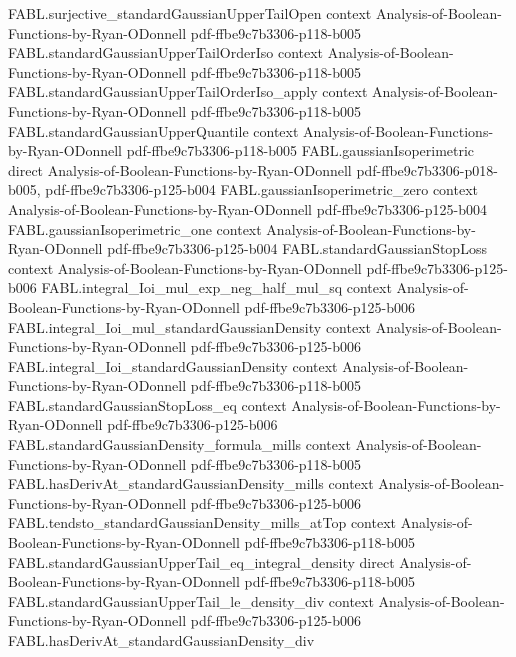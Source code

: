 \begin{theorem}
\proofstep
  {FABL.surjective_standardGaussianUpperTailOpen}
  {context}
  {Analysis-of-Boolean-Functions-by-Ryan-ODonnell}
  {pdf-ffbe9c7b3306-p118-b005}
\proofstep
  {FABL.standardGaussianUpperTailOrderIso}
  {context}
  {Analysis-of-Boolean-Functions-by-Ryan-ODonnell}
  {pdf-ffbe9c7b3306-p118-b005}
\proofstep
  {FABL.standardGaussianUpperTailOrderIso_apply}
  {context}
  {Analysis-of-Boolean-Functions-by-Ryan-ODonnell}
  {pdf-ffbe9c7b3306-p118-b005}
\proofstep
  {FABL.standardGaussianUpperQuantile}
  {context}
  {Analysis-of-Boolean-Functions-by-Ryan-ODonnell}
  {pdf-ffbe9c7b3306-p118-b005}
\proofstep
  {FABL.gaussianIsoperimetric}
  {direct}
  {Analysis-of-Boolean-Functions-by-Ryan-ODonnell}
  {pdf-ffbe9c7b3306-p018-b005,
    pdf-ffbe9c7b3306-p125-b004}
\proofstep
  {FABL.gaussianIsoperimetric_zero}
  {context}
  {Analysis-of-Boolean-Functions-by-Ryan-ODonnell}
  {pdf-ffbe9c7b3306-p125-b004}
\proofstep
  {FABL.gaussianIsoperimetric_one}
  {context}
  {Analysis-of-Boolean-Functions-by-Ryan-ODonnell}
  {pdf-ffbe9c7b3306-p125-b004}
\proofstep
  {FABL.standardGaussianStopLoss}
  {context}
  {Analysis-of-Boolean-Functions-by-Ryan-ODonnell}
  {pdf-ffbe9c7b3306-p125-b006}
\proofstep
  {FABL.integral_Ioi_mul_exp_neg_half_mul_sq}
  {context}
  {Analysis-of-Boolean-Functions-by-Ryan-ODonnell}
  {pdf-ffbe9c7b3306-p125-b006}
\proofstep
  {FABL.integral_Ioi_mul_standardGaussianDensity}
  {context}
  {Analysis-of-Boolean-Functions-by-Ryan-ODonnell}
  {pdf-ffbe9c7b3306-p125-b006}
\proofstep
  {FABL.integral_Ioi_standardGaussianDensity}
  {context}
  {Analysis-of-Boolean-Functions-by-Ryan-ODonnell}
  {pdf-ffbe9c7b3306-p118-b005}
\proofstep
  {FABL.standardGaussianStopLoss_eq}
  {context}
  {Analysis-of-Boolean-Functions-by-Ryan-ODonnell}
  {pdf-ffbe9c7b3306-p125-b006}
\proofstep
  {FABL.standardGaussianDensity_formula_mills}
  {context}
  {Analysis-of-Boolean-Functions-by-Ryan-ODonnell}
  {pdf-ffbe9c7b3306-p118-b005}
\proofstep
  {FABL.hasDerivAt_standardGaussianDensity_mills}
  {context}
  {Analysis-of-Boolean-Functions-by-Ryan-ODonnell}
  {pdf-ffbe9c7b3306-p125-b006}
\proofstep
  {FABL.tendsto_standardGaussianDensity_mills_atTop}
  {context}
  {Analysis-of-Boolean-Functions-by-Ryan-ODonnell}
  {pdf-ffbe9c7b3306-p118-b005}
\proofstep
  {FABL.standardGaussianUpperTail_eq_integral_density}
  {direct}
  {Analysis-of-Boolean-Functions-by-Ryan-ODonnell}
  {pdf-ffbe9c7b3306-p118-b005}
\proofstep
  {FABL.standardGaussianUpperTail_le_density_div}
  {context}
  {Analysis-of-Boolean-Functions-by-Ryan-ODonnell}
  {pdf-ffbe9c7b3306-p125-b006}
\proofstep
  {FABL.hasDerivAt_standardGaussianDensity_div}

\end{theorem}
